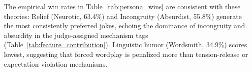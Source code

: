 \documentclass[11pt]{article}
\begin{document}
The empirical win rates in Table~\ref{tab:persona_wins} are consistent with these theories: Relief (Neurotic, 63.4\%) and Incongruity (Absurdist, 55.8\%) generate the most consistently preferred jokes, echoing the dominance of incongruity and absurdity in the judge-assigned mechanism tags (Table~\ref{tab:feature_contribution}). Linguistic humor (Wordsmith, 34.9\%) scores lowest, suggesting that forced wordplay is penalized more than tension-release or expectation-violation mechanisms.
\newpage




\end{document}
